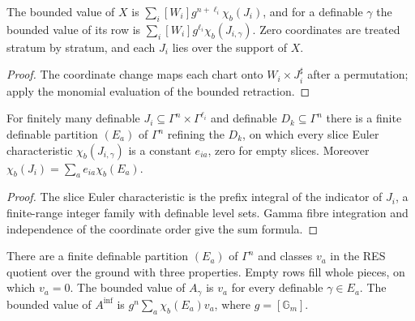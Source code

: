 \begin{lemma}
\label{relative-values}
\leanok
{}
The bounded value of $X$ is $\sum_i[W_i]g^{n+\ell_i}\chi_b(J_i)$, and for a definable $\gamma$ the bounded value of its row is $\sum_i[W_i]g^{\ell_i}\chi_b(J_{i,\gamma})$. Zero coordinates are treated stratum by stratum, and each $J_i$ lies over the support of $X$.
\end{lemma}

\begin{proof}
The coordinate change maps each chart onto $W_i\times J_i^\sharp$ after a permutation; apply the monomial evaluation of the bounded retraction.
\end{proof}

\begin{lemma}
\label{base-partition}
\leanok
{}
For finitely many definable $J_i\subseteq\Gamma^n\times\Gamma^{\ell_i}$ and definable $D_k\subseteq\Gamma^n$ there is a finite definable partition $(E_a)$ of $\Gamma^n$ refining the $D_k$, on which every slice Euler characteristic $\chi_b(J_{i,\gamma})$ is a constant $e_{ia}$, zero for empty slices. Moreover $\chi_b(J_i)=\sum_a e_{ia}\chi_b(E_a)$.
\end{lemma}

\begin{proof}
The slice Euler characteristic is the prefix integral of the indicator of $J_i$, a finite-range integer family with definable level sets. Gamma fibre integration and independence of the coordinate order give the sum formula.
\end{proof}

\begin{theorem}
\label{inflated}
\leanok
{}
There are a finite definable partition $(E_a)$ of $\Gamma^n$ and classes $v_a$ in the RES quotient over the ground with three properties. Empty rows fill whole pieces, on which $v_a=0$. The bounded value of $A_\gamma$ is $v_a$ for every definable $\gamma\in E_a$. The bounded value of $A^{\mathrm{inf}}$ is $g^n\sum_a\chi_b(E_a)v_a$, where $g=[\mathbb G_m]$.
\end{theorem}

